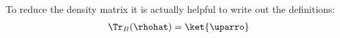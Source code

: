 To reduce the density matrix it is actually helpful to write out the definitions:
\begin{align}
\Tr_B(\rhohat) = \ket{\uparro}
\end{align}